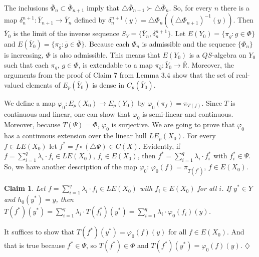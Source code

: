 \documentclass[12pt]{amsart}
\newtheorem{claim}{Claim}
\begin{document}
The inclusions $\overline\Phi_n\subset\overline\Phi_{n+1}$ imply that $\triangle\overline\Phi_{n+1}\succ\triangle\overline\Phi_{n}$. So, for every $n$ there is a map $\delta^{n+1}_n:\overline Y_{n+1}\to\overline Y_n$ defined by $\delta^{n+1}_n(y)=\triangle\Phi_{n}((\triangle\Phi_{n+1})^{-1}(y))$.
Then $\overline Y_0$ is the limit of the inverse sequence $S_Y=\{\overline Y_n,\delta^{n+1}_n\}$. 
Let $E(Y_0)=\{\pi_g:g\in\Phi\}$ and $E(\overline Y_0)=\{\pi_{\overline g}:\overline g\in\overline\Phi\}$. Because each $\Phi_n$ is admissible and the sequence $\{\Phi_n\}$ is increasing, $\Phi$ is also admissible. This means that $E(Y_0)$ is a $QS$-algebra on $Y_0$ such that each $\pi_g$, $g\in\Phi$, is extendable to a map $\pi_{\overline g}:\overline Y_0\to\overline{\mathbb R}$. Moreover, the arguments from the proof of Claim 7 from Lemma 3.4 show that 
the set of real-valued elements of $E_p(\overline Y_0)$ is dense in $C_p(\overline Y_0)$.

We define a map 
$\varphi_0:E_p(X_0)\to E_p(Y_0)$ by  $\varphi_0(\pi_f)=\pi_{T(f)}$. Since $T$ is continuous and linear, one can show that $\varphi_0$ is semi-linear and continuous. Moreover, because $T(\Psi)=\Phi$, $\varphi_0$ is surjective.
We are going to prove that $\varphi_0$ has a continuous extension over the linear hull $LE_p(X_0)$. For every $f\in LE(X_0)$ let $f^*=f\circ(\triangle\Psi)\in C(X)$. Evidently, if  
$f=\sum_{i=1}^q\lambda_i\cdot f_i\in LE(X_0)$, $f_i\in E(X_0)$, then $f^*=\sum_{i=1}^q\lambda_i\cdot f_i^*$ with $f_i^*\in\Psi$. So, we have another description of the map $\varphi_0$: 
$\varphi_0(f)=\pi_{T(f^*)}$, $f\in E(X_0)$.
\begin{claim}
Let $f=\sum_{i=1}^q\lambda_i\cdot f_i\in LE(X_0)$ with $f_i\in E(X_0)$ for all $i$. If $y^*\in Y$ and $h_0(y^*)=y$, then
$T(f^*)(y^*)=\sum_{i=1}^q\lambda_i\cdot T(f_i^*)(y^*)=\sum_{i=1}^q\lambda_i\cdot\varphi_0(f_i)(y)$. 
\end{claim}
It suffices to show that $T(f^*)(y^*)=\varphi_0(f)(y)$ for all $f\in E(X_0)$. And that is true because $f^*\in\Psi$, so $T(f^*)\in\Phi$ and $T(f^*)(y^*)=\varphi_0(f)(y)$. $\diamondsuit$
\end{document}
